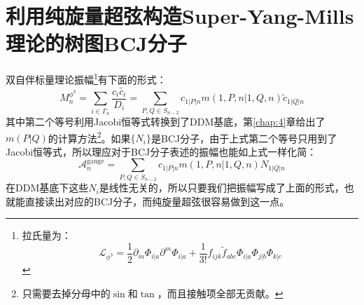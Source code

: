 \section{利用纯旋量超弦构造Super-Yang-Mills理论的树图BCJ分子}
双自伴标量理论振幅\footnote{拉氏量为：\[\mathcal{L}_{\phi^3}=\frac{1}{2}\partial_m\Phi_{i|a}\partial^m\Phi_{i|a}+\frac{1}{3!}f_{ijk}\tilde{f}_{abc}\Phi_{i|a}\Phi_{j|b}\Phi_{k|c}\]}有下面的形式：
\begin{equation}
	M_n^{\phi^3}=\sum_{i\in\Gamma_n}\frac{c_i\tilde{c_i}}{D_i}=\sum_{P,Q\in S_{n-2}}c_{1|P|n}m(1,P,n|1,Q,n)\tilde{c}_{1|Q|n}
\end{equation}
其中第二个等号利用Jacobi恒等式转换到了DDM基底，第\ref{chap:4}章给出了$m(P|Q)$的计算方法\footnote{只需要去掉分母中的$\sin$和$\tan$，而且接触项全部无贡献。}。如果$\{N_i\}$是BCJ分子，由于上式第二个等号只用到了Jacobi恒等式，所以理应对于BCJ分子表述的振幅也能如上式一样化简：
\begin{equation}
	\mathcal{A}_n^\mathrm{gauge}=\sum_{P,Q\in S_{n-2}}c_{1|P|n}m(1,P,n|1,Q,n)N_{1|Q|n}
\end{equation}
在DDM基底下这些$N_i$是线性无关的，所以只要我们把振幅写成了上面的形式，也就能直接读出对应的BCJ分子，而纯旋量超弦很容易做到这一点。

